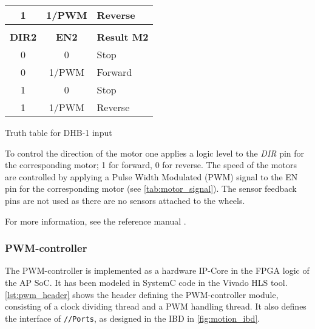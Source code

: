 \documentclass[Main]{subfiles}
\begin{document}
\begin{table}[H]
\begin{subtable}[b]{0.3\linewidth}
\begin{tabular}{ccl}
						\multicolumn{1}{|c|}{1}          & \multicolumn{1}{c|}{1/PWM}     & \multicolumn{1}{l|}{Reverse}         \\ \hline
						                                 &                                &                                      \\ \hline
						\multicolumn{1}{|c|}{{\bf DIR2}} & \multicolumn{1}{c|}{{\bf EN2}} & \multicolumn{1}{l|}{{\bf Result M2}} \\ \hline
						\multicolumn{1}{|c|}{0}          & \multicolumn{1}{c|}{0}         & \multicolumn{1}{l|}{Stop}            \\ \hline
						\multicolumn{1}{|c|}{0}          & \multicolumn{1}{c|}{1/PWM}     & \multicolumn{1}{l|}{Forward}         \\ \hline
						\multicolumn{1}{|c|}{1}          & \multicolumn{1}{c|}{0}         & \multicolumn{1}{l|}{Stop}            \\ \hline
						\multicolumn{1}{|c|}{1}          & \multicolumn{1}{c|}{1/PWM}     & \multicolumn{1}{l|}{Reverse}         \\ \hline
					\end{tabular}
					\caption{Truth table for DHB-1 input}
					\label{tab:motor_signal}
				\end{subtable}
				\caption{} 
			\end{table} 

			To control the direction of the motor one applies a logic level to the \emph{DIR} pin for the corresponding motor; 1 for forward, 0 for reverse.
			The speed of the motors are controlled by applying a Pulse Width Modulated (PWM) signal to the EN pin for the corresponding motor (see \autoref{tab:motor_signal}).
			The sensor feedback pins are not used as there are no sensors attached to the wheels.

			For more information, see the reference manual \cite{Digilent2013}.


		\subsubsection{PWM-controller} %
		\label{ssub:pwm_controller}
			
			The PWM-controller is implemented as a hardware IP-Core in the FPGA logic of the AP SoC.
			It has been modeled in SystemC code in the Vivado HLS tool.
			\autoref{lst:pwm_header} shows the header defining the PWM-controller module, consisting of a clock dividing thread and a PWM handling thread.
			It also defines the interface of \texttt{//Ports}, as designed in the IBD in \autoref{fig:motion_ibd}.
\end{document}

